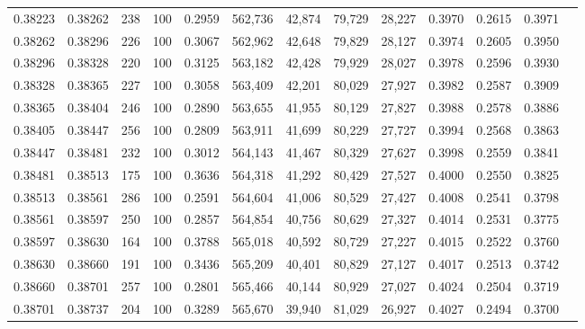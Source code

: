 \begin{tabular}{rrrrrrrrrrrrr}
0.38223 & 0.38262 &   238 & 100 &                                     0.2959 & 562,736 &  42,874 &  79,729 &  28,227 & 0.3970 & 0.2615 & 0.3971 \\
0.38262 & 0.38296 &   226 & 100 &                                     0.3067 & 562,962 &  42,648 &  79,829 &  28,127 & 0.3974 & 0.2605 & 0.3950 \\
0.38296 & 0.38328 &   220 & 100 &                                     0.3125 & 563,182 &  42,428 &  79,929 &  28,027 & 0.3978 & 0.2596 & 0.3930 \\
0.38328 & 0.38365 &   227 & 100 &                                     0.3058 & 563,409 &  42,201 &  80,029 &  27,927 & 0.3982 & 0.2587 & 0.3909 \\
0.38365 & 0.38404 &   246 & 100 &                                     0.2890 & 563,655 &  41,955 &  80,129 &  27,827 & 0.3988 & 0.2578 & 0.3886 \\
0.38405 & 0.38447 &   256 & 100 &                                     0.2809 & 563,911 &  41,699 &  80,229 &  27,727 & 0.3994 & 0.2568 & 0.3863 \\
0.38447 & 0.38481 &   232 & 100 &                                     0.3012 & 564,143 &  41,467 &  80,329 &  27,627 & 0.3998 & 0.2559 & 0.3841 \\
0.38481 & 0.38513 &   175 & 100 &                                     0.3636 & 564,318 &  41,292 &  80,429 &  27,527 & 0.4000 & 0.2550 & 0.3825 \\
0.38513 & 0.38561 &   286 & 100 &                                     0.2591 & 564,604 &  41,006 &  80,529 &  27,427 & 0.4008 & 0.2541 & 0.3798 \\
0.38561 & 0.38597 &   250 & 100 &                                     0.2857 & 564,854 &  40,756 &  80,629 &  27,327 & 0.4014 & 0.2531 & 0.3775 \\
0.38597 & 0.38630 &   164 & 100 &                                     0.3788 & 565,018 &  40,592 &  80,729 &  27,227 & 0.4015 & 0.2522 & 0.3760 \\
0.38630 & 0.38660 &   191 & 100 &                                     0.3436 & 565,209 &  40,401 &  80,829 &  27,127 & 0.4017 & 0.2513 & 0.3742 \\
0.38660 & 0.38701 &   257 & 100 &                                     0.2801 & 565,466 &  40,144 &  80,929 &  27,027 & 0.4024 & 0.2504 & 0.3719 \\
0.38701 & 0.38737 &   204 & 100 &                                     0.3289 & 565,670 &  39,940 &  81,029 &  26,927 & 0.4027 & 0.2494 & 0.3700 \\

\end{tabular}

